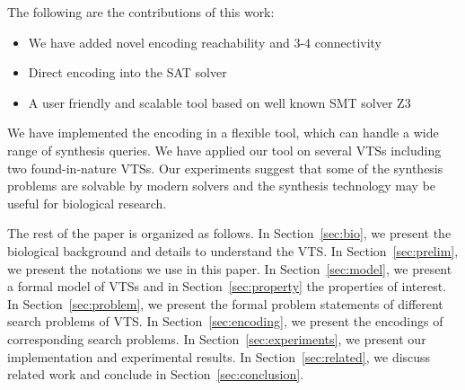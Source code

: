 The following are the contributions of this work:
\begin{itemize}
	\item We have added novel encoding reachability and 3-4 connectivity
	\item Direct encoding into the SAT solver
	\item A user friendly and scalable tool based on well known SMT solver Z3
\end{itemize}


\par We have implemented the encoding in a flexible tool, which can handle a wide range of synthesis queries. 
%
We have applied our tool on several VTSs including
two found-in-nature VTSs.
%
Our experiments suggest that some of the synthesis problems are solvable by modern solvers and the synthesis technology may be useful for biological research.
%

%
The rest of the paper is organized as follows. 
%
In Section~\ref{sec:bio}, we present the biological background and details to understand the VTS. 
%
In Section~\ref{sec:prelim}, we present the notations we use in this paper. 
%
In Section~\ref{sec:model}, we present a formal model of VTSs and in Section~\ref{sec:property} the properties of interest.
%
In Section~\ref{sec:problem}, we present the formal problem statements of different search problems of VTS.
%
In Section~\ref{sec:encoding}, we present the encodings of corresponding search problems. 
%
In Section~\ref{sec:experiments}, we present our implementation and experimental results. 
%
In Section~\ref{sec:related}, we discuss related work and conclude in Section~\ref{sec:conclusion}.
%
~        
